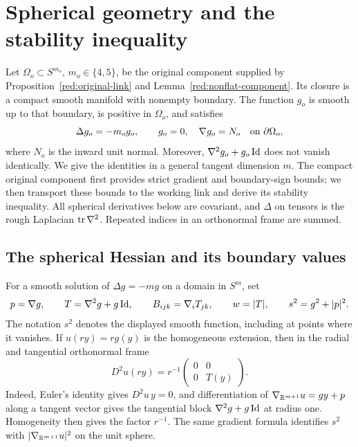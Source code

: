 \section{Spherical geometry and the stability inequality}
\label{geo:section}
\label{sec:geometry}

Let $\Omega_o\subset S^{m_o}$, $m_o\in\{4,5\}$, be the original
component supplied by Proposition~\ref{red:original-link} and
Lemma~\ref{red:nonflat-component}. Its closure is a compact smooth
manifold with nonempty boundary. The function $g_o$ is smooth up to that
boundary, is positive in $\Omega_o$, and satisfies
\[
 \Delta g_o=-m_o g_o,\qquad
 g_o=0,\quad \nabla g_o=N_o\quad\hbox{on }\partial\Omega_o,
\]
where $N_o$ is the inward unit normal. Moreover,
$\nabla^2g_o+g_o\operatorname{Id}$ does not vanish identically.
We give the identities in a general tangent dimension $m$. The compact
original component first provides strict gradient and boundary-sign
bounds; we then transport these bounds to the working link and derive
its stability inequality.
All spherical derivatives below are covariant, and $\Delta$ on tensors
is the rough Laplacian $\operatorname{tr}\nabla^2$. Repeated indices in an orthonormal
frame are summed.

\subsection{The spherical Hessian and its boundary values}

For a smooth solution of $\Delta g=-mg$ on a domain in $S^m$, set
\begin{equation}\label{geo:data}
 p=\nabla g,\qquad T=\nabla^2g+g\operatorname{Id},\qquad
 B_{ijk}=\nabla_iT_{jk},\qquad w=|T|,\qquad s^2=g^2+|p|^2.
\end{equation}
The notation $s^2$ denotes the displayed smooth function, including at
points where it vanishes. If $u(ry)=rg(y)$ is the homogeneous extension,
then in the radial and tangential orthonormal frame
\begin{equation}\label{geo:ambient-hessian}
 D^2u(ry)=r^{-1}
 \begin{pmatrix}0&0\\0&T(y)\end{pmatrix}.
\end{equation}
Indeed, Euler's identity gives $D^2u\,y=0$, and differentiation of
$\nabla_{\mathbb R^{m+1}}u=g y+p$ along a tangent vector gives the tangential
block $\nabla^2g+g\operatorname{Id}$ at radius one. Homogeneity then gives the factor
$r^{-1}$.
The same gradient formula identifies $s^2$ with
$|\nabla_{\mathbb R^{m+1}}u|^2$ on the unit sphere.

